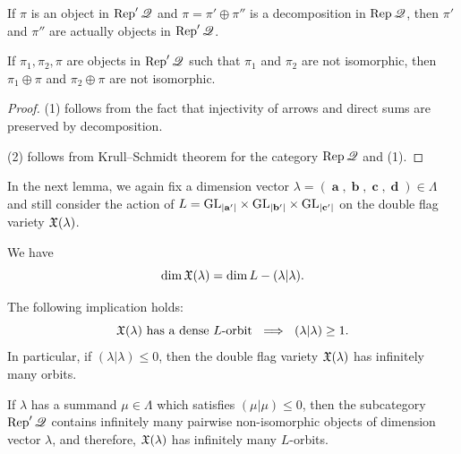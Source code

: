 \documentclass[12pt,reqno]{amsart}
\begin{document}
\begin{lemma}\label{lemma:quiver.category}
\begin{penumerate}
\item If $\pi$ is an object in $\Rep'\quiver$ and $\pi=\pi' \oplus \pi''$
is a decomposition in $\Rep\quiver$,
then $\pi'$ and $\pi''$ are actually objects in $\Rep'\quiver$.
\item If $\pi_1,\pi_2,\pi$ are objects in $\Rep'\quiver$ such that $\pi_1$ and $\pi_2$ are not isomorphic, then $\pi_1 \oplus \pi$ and $\pi_2 \oplus \pi$ are not isomorphic.
\end{penumerate}
\end{lemma}

\begin{proof}
(1) follows from the fact that injectivity of arrows and direct sums are preserved by decomposition.

(2) follows from Krull--Schmidt theorem for the category $ \Rep\quiver $ and (1).
\end{proof}

In the next lemma, we again fix a dimension vector $\lambda=(\mbfa,\mbfb,\mbfc,\mbfd)\in\Lambda$ and still consider the action of $L=\mathrm{GL}_{|\mathbf{a}'|}\times \mathrm{GL}_{|\mathbf{b}'|}\times \mathrm{GL}_{|\mathbf{c}'|}$ on the double flag variety $\mathfrak{X}(\lambda)$.

\begin{lemma}\label{lemma:criterion.dense.orbit}
\begin{penumerate}
\item We have
%
\begin{equation}\label{dimension:Xabcd}
\dim \mathfrak{X}(\lambda)=\dim L-(\lambda|\lambda).
\end{equation}
%
\item The following implication holds:
%
\begin{equation}\label{eq:dense.orbit.implies.form.is.positive}
\text{$\Xfv(\lambda)$ has a dense $L$-orbit}\ \implies \ (\lambda|\lambda)\geq 1.
\end{equation}
%
In particular, if $(\lambda|\lambda)\leq 0$,
then the double flag variety $\mathfrak{X}(\lambda)$ has infinitely many orbits.
\item
If $ \lambda $ has a summand $ \mu \in \Lambda $ which satisfies $ (\mu|\mu)\leq 0$,
then the subcategory $ \Rep' \quiver $ contains infinitely many pairwise non-isomorphic objects of dimension vector $\lambda$, and therefore, $\mathfrak{X}(\lambda)$ has infinitely many $L$-orbits.
\end{penumerate}
\end{lemma}
\end{document}
